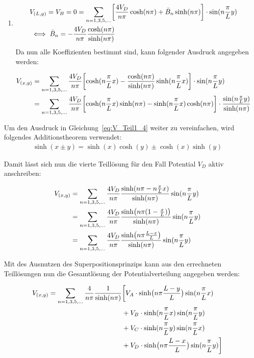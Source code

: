 \begin{enumerate}
	\item \begin{align}
		&V_{(L,y)} = V_B = 0 = \sum_{n = 1,3,5,...} \biggl[ \frac{4V_D}{n \pi} \cosh(n \pi) + \bar{B}_n \sinh(n \pi) \biggr] \cdot \sin(n \frac{\pi}{L} y)\\
		&\iff \bar{B}_n = - \frac{4V_D}{n \pi} \frac{\cosh(n \pi)}{\sinh(n \pi)} \notag
	\end{align}
	Da nun alle Koeffizienten bestimmt sind, kann folgender Ausdruck angegeben werden:
	
	\begin{align}
		V_{(x,y)} &= \sum_{n = 1,3,5,...} \frac{4V_D}{n \pi} \biggl[\cosh(n \frac{\pi}{L} x) - \frac{\cosh(n \pi)}{\sinh(n \pi)} \sinh(n \frac{\pi}{L} x) \biggr] \cdot \sin(n \frac{\pi}{L} y) \\
		&= \sum_{n = 1,3,5,...} \frac{4V_D}{n \pi} \biggl[\cosh(n \frac{\pi}{L} x) \sinh(n \pi) - \sinh(n \frac{\pi}{L} x) \cosh(n \pi) \biggr] \cdot \frac{\sin(n \frac{\pi}{L} y)}{\sinh(n \pi)} \notag \label{eq:V_Teil1_4}
	\end{align}
\end{enumerate}

Um den Ausdruck in Gleichung~\ref{eq:V_Teil1_4} weiter zu vereinfachen, wird folgendes Additionstheorem verwendet:
\begin{align}
	\sinh(x \pm y) = \sinh(x)\cosh(y) \pm \cosh(x)\sinh(y)
\end{align}

Damit lässt sich nun die vierte Teillösung für den Fall Potential $V_D$ aktiv anschreiben:

\begin{align}
	V_{(x,y)} &= \sum_{n = 1,3,5,...} \frac{4V_D}{n \pi} \frac{\sinh(n \pi - n \frac{\pi}{L} x)}{\sinh(n \pi)} \sin(n \frac{\pi}{L} y) \\
	&= \sum_{n = 1,3,5,...} \frac{4V_D}{n \pi} \frac{\sinh \bigl(n \pi (1 - \frac{x}{L})\bigr)}{\sinh(n \pi)} \sin(n \frac{\pi}{L} y) \notag \\
	&= \sum_{n = 1,3,5,...} \frac{4V_D}{n \pi} \frac{\sinh \bigl(n \pi \frac{L-x}{L}\bigr)}{\sinh(n \pi)} \sin(n \frac{\pi}{L} y) \notag
\end{align}

Mit des Ausnutzen des Superpositionsprinzips kann aus den errechneten Teillösungen nun die Gesamtlösung der Potentialverteilung angegeben werden:

\begin{align}
	V_{(x,y)} = \sum_{n = 1,3,5,...} \frac{4}{n \pi} \frac{1}{\sinh(n \pi)}&\biggl[
	V_A \cdot \sinh \bigl(n \pi \frac{L-y}{L}\bigr) \sin(n \frac{\pi}{L} x) \\ 
	&+ V_B \cdot \sinh(n \frac{\pi}{L}x) \sin(n \frac{\pi}{L}y) \notag \\
	&+ V_C \cdot \sinh(n \frac{\pi}{L}y) \sin(n \frac{\pi}{L}x) \notag \\
	&+ V_D \cdot \sinh \bigl(n \pi \frac{L-x}{L}\bigr) \sin(n \frac{\pi}{L} y) \biggr] \notag
\end{align}


